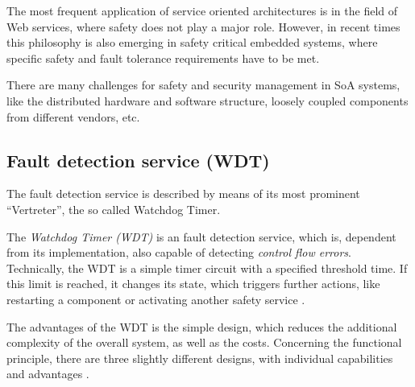 The most frequent application of service oriented architectures is in the field of Web services, where safety does not play a major role. However, in recent times this philosophy is also emerging in safety critical embedded systems, where specific safety and fault tolerance requirements have to be met.

There are many challenges for safety and security management in SoA systems, like the distributed hardware and software structure, loosely coupled components from different vendors, etc.


\subsection{Fault detection service (WDT)}

The fault detection service is described by means of its most prominent ``Vertreter'', the so called Watchdog Timer.

The \emph{Watchdog Timer (WDT)} is an fault detection service, which is, dependent from its implementation, also capable of detecting \emph{control flow errors}. Technically, the WDT is a simple timer circuit with a specified threshold time. If this limit is reached, it changes its state, which triggers further actions, like restarting a component or activating another safety service \cite{elattar2007}.

The advantages of the WDT is the simple design, which reduces the additional complexity of the overall system, as well as the costs. Concerning the functional principle, there are three slightly different designs, with individual capabilities and advantages \cite{elattar2007}.

